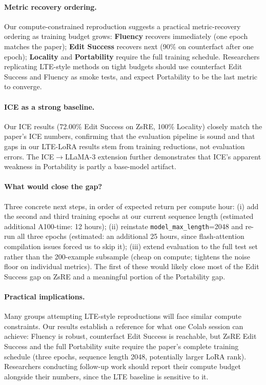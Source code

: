 \documentclass[11pt,a4paper,twocolumn]{article}
\begin{document}
\paragraph{Metric recovery ordering.} Our compute-constrained reproduction suggests a practical metric-recovery ordering as training budget grows: \textbf{Fluency} recovers immediately (one epoch matches the paper); \textbf{Edit Success} recovers next (90\% on counterfact after one epoch); \textbf{Locality} and \textbf{Portability} require the full training schedule. Researchers replicating LTE-style methods on tight budgets should use counterfact Edit Success and Fluency as smoke tests, and expect Portability to be the last metric to converge.

\paragraph{ICE as a strong baseline.} Our ICE results (72.00\% Edit Success on ZsRE, 100\% Locality) closely match the paper's ICE numbers, confirming that the evaluation pipeline is sound and that gaps in our LTE-LoRA results stem from training reductions, not evaluation errors. The ICE$\rightarrow$LLaMA-3 extension further demonstrates that ICE's apparent weakness in Portability is partly a base-model artifact.

\paragraph{What would close the gap?} Three concrete next steps, in order of expected return per compute hour: (i) add the second and third training epochs at our current sequence length (estimated additional A100-time: 12 hours); (ii) reinstate \texttt{model\_max\_length}=2048 and re-run all three epochs (estimated: an additional 25 hours, since flash-attention compilation issues forced us to skip it); (iii) extend evaluation to the full test set rather than the 200-example subsample (cheap on compute; tightens the noise floor on individual metrics). The first of these would likely close most of the Edit Success gap on ZsRE and a meaningful portion of the Portability gap.

\paragraph{Practical implications.} Many groups attempting LTE-style reproductions will face similar compute constraints. Our results establish a reference for what one Colab session can achieve: Fluency is robust, counterfact Edit Success is reachable, but ZsRE Edit Success and the full Portability suite require the paper's complete training schedule (three epochs, sequence length 2048, potentially larger LoRA rank). Researchers conducting follow-up work should report their compute budget alongside their numbers, since the LTE baseline is sensitive to it.
\end{document}
